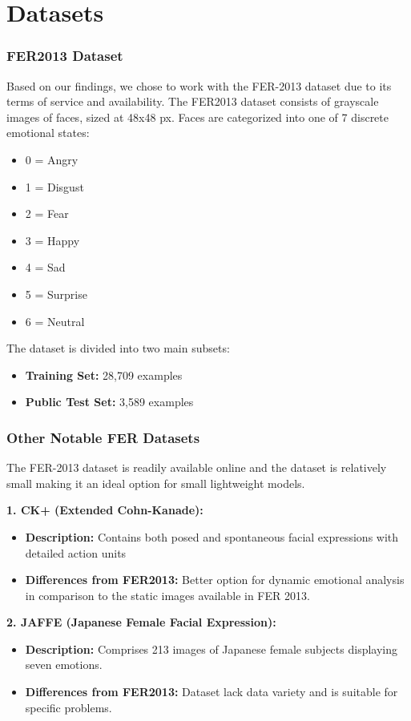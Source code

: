 \documentclass{article}
\begin{document}
\section*{Datasets}

\subsubsection*{FER2013 Dataset}
Based on our findings, we chose to work with the FER-2013 dataset due to its terms of service and availability.
The FER2013 dataset consists of grayscale images of faces, sized at 48x48 px. 
Faces are categorized into one of 7 discrete emotional states:

\begin{itemize}
    \item 0 = Angry
    \item 1 = Disgust
    \item 2 = Fear
    \item 3 = Happy
    \item 4 = Sad
    \item 5 = Surprise
    \item 6 = Neutral
\end{itemize}

The dataset is divided into two main subsets:
\begin{itemize}
    \item \textbf{Training Set:} 28,709 examples
    \item \textbf{Public Test Set:} 3,589 examples
\end{itemize}

\subsubsection*{Other Notable FER Datasets}
The FER-2013 dataset is readily available online and the dataset is relatively small making it an ideal option for small lightweight models.

\textbf{1. CK+ (Extended Cohn-Kanade):}
\begin{itemize}
    \item \textbf{Description:} Contains both posed and spontaneous facial expressions with detailed action units
    \item \textbf{Differences from FER2013:} Better option for dynamic emotional analysis in comparison to the static images available in FER 2013.
\end{itemize}

\textbf{2. JAFFE (Japanese Female Facial Expression):}
\begin{itemize}
    \item \textbf{Description:} Comprises 213 images of Japanese female subjects displaying seven emotions.
    \item \textbf{Differences from FER2013:} Dataset lack data variety and is suitable for specific problems.
\end{itemize}
\end{document}
